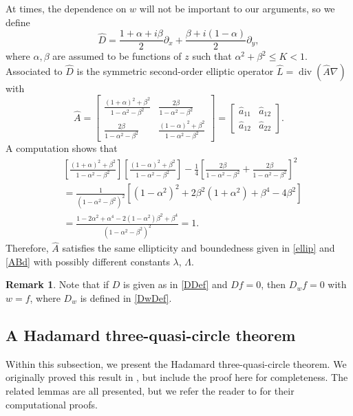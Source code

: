\documentclass[12pt,reqno]{amsart}
\theoremstyle{plain}
\theoremstyle{definition}
\newtheorem*{rem}{Remark}
\newcommand{\disp}{\displaystyle}
\DeclareMathOperator{\di}{div}
\newcommand{\al}{\alpha}
\newcommand{\be}{\beta}
\newcommand{\del}{ \partial}
\newcommand{\gr}{\nabla}
\newcommand{\brac}[1]{\left[#1\right]}
\newcommand{\pr}[1]{\left( #1 \right) }
\begin{document}
At times, the dependence on $w$ will not be important to our arguments, so we define
\begin{equation}
\hat D = \frac{1 + \al + i \be}{2} \del_x + \frac{ \be + i \pr{1 - \al}}{2} \del_y,
\label{hatDDef}
\end{equation}
where $\al, \be$ are assumed to be functions of $z$ such that $\disp \al^2 + \be^2 \le K < 1$.
Associated to $\hat D$ is the symmetric second-order elliptic operator $\hat L = \di \pr{ \hat A \gr}$ with 
\begin{equation}
\hat A 
= \brac{\begin{array}{ll} \frac{\pr{1+\al}^2 + \be^2}{1 - \al^2 - \be^2} & \frac{2 \be}{1 - \al^2 - \be^2} \\ \frac{2\be}{1 - \al^2 - \be^2} &  \frac{\pr{1-\al}^2 + \be^2}{1 - \al^2 - \be^2} \end{array}}
= \brac{\begin{array}{ll} \hat a_{11} & \hat a_{12} \\ \hat a_{12} & \hat a_{22} \end{array}}.
\label{hatADef}
\end{equation}
A computation shows that
\begin{align*}
& \brac{\frac{\pr{1+\al}^2 + \be^2}{1 - \al^2 - \be^2}}\brac{ \frac{\pr{1-\al}^2 + \be^2}{1 - \al^2 - \be^2}} - \frac 1 4\brac{\frac{2 \be}{1 - \al^2 - \be^2} + \frac{2 \be}{1 - \al^2 - \be^2}}^2 \\
&= \frac{1}{ \pr{1 - \al^2 - \be^2}^2}\brac{\pr{1 - \al^2}^2 + 2\be^2\pr{1 + \al^2} + \be^4 - 4\be^2} \\
&= \frac{1 - 2\al^2 + \al^4 - 2\pr{1 - \al^2}\be^2 + \be^4}{ \pr{1 - \al^2 - \be^2}^2}
= 1.
\end{align*}
Therefore, $\hat A$ satisfies the same ellipticity and boundedness given in \eqref{ellip} and \eqref{ABd} with possibly different constants $\lambda$, $\Lambda$. 

\begin{rem}
\label{rem4.1}
{Note that if $D$ is given as in \eqref{DDef} and $Df=0$, then $D_wf=0$ with $w=f$, where $D_w$ is defined in \eqref{DwDef}.}
\end{rem}

\subsection{A Hadamard three-quasi-circle theorem}

Within this subsection, we present the Hadamard three-quasi-circle theorem.
We originally proved this result in \cite[Theorem~4.5]{DKW17}, but include the proof here for completeness.
The related lemmas are all presented, but we refer the reader to \cite{DKW17} for their computational proofs.
\end{document}
